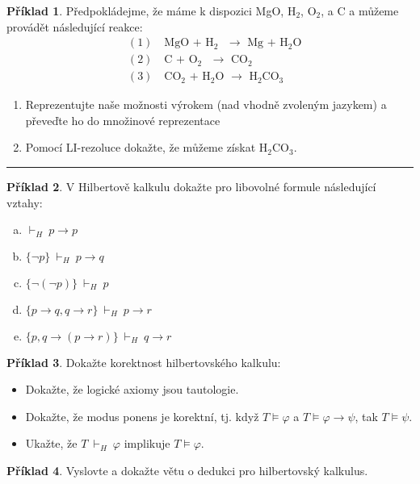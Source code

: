\documentclass{amsart}
\theoremstyle{definition}
\newtheorem{problem}{Příklad}
\begin{document}
\begin{problem}Předpokládejme, že máme k dispozici MgO, H$_2$, O$_2$, a C a můžeme provádět následující reakce:
\begin{align*}&(1)\quad\text{MgO\ +\ H$_2$\ \ $\to$\ \ Mg\ +\ H$_2$O}\\
&(2)\quad\text{C\ +\ O$_2$\ \ $\to$\ \ CO$_2$}\\
&(3)\quad\text{CO$_2$\ +\ H$_2$O\ \ $\to$\ \ H$_2$CO$_3$}
\end{align*}
\begin{enumerate}
\item Reprezentujte naše možnosti výrokem (nad vhodně zvoleným jazykem) a převeďte ho do množinové reprezentace
\item Pomocí LI-rezoluce dokažte, že můžeme získat H$_2$CO$_3$.
\end{enumerate}
\end{problem}\medskip

\hrule

\begin{problem}
V Hilbertově kalkulu dokažte pro libovolné formule následující vztahy:
\begin{enumerate}[(a)]
\item $\vdash_H\ p\to p$
\item $\{\neg p\}\ \vdash_H\ p\to q$
\item $\{\neg(\neg p)\}\ \vdash_H\ p$
\item $\{p\to q,q \to r\}\ \vdash_H\ p\to r$
\item $\{p, q \to (p\to r)\}\ \vdash_H\ q\to r$

\end{enumerate}
\end{problem}\medskip

\begin{problem}
Dokažte korektnost hilbertovského kalkulu:
\begin{itemize}
    \item Dokažte, že logické axiomy jsou tautologie.
    \item Dokažte, že modus ponens je korektní, tj. když $T\models\varphi$ a $T\models\varphi\to\psi$, tak $T\models\psi$.
    \item Ukažte, že $T\ \vdash_H\ \varphi$ implikuje $T\models\varphi$.
\end{itemize}
\end{problem}\medskip

\begin{problem}
Vyslovte a dokažte větu o dedukci pro hilbertovský kalkulus.
\end{problem}\medskip
\end{document}
